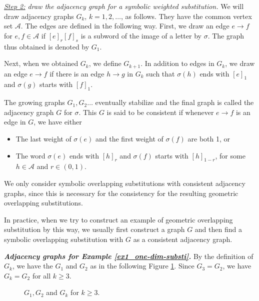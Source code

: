 \documentclass[a4]{amsart}
\theoremstyle{definition}
\newtheorem{ex}[theorem]{Example}
\begin{document}
\emph{\underline{Step 2:} draw the adjacency graph for a symbolic weighted substitution.}
We will draw adjacency graphs $G_k$, $k=1,2,\ldots$, as follows.
They have the common vertex set $\mathcal{A}$.
The edges are defined in the following way.
First, we draw an edge $e\rightarrow f$
for $e,f\in\mathcal{A}$ if $[e]_r[f]_s$ is a subword
of the image of a letter by $\sigma$.
The graph
thus obtained is denoted by $G_1$.

Next, when we obtained $G_k$, we define $G_{k+1}$. 
In addition to edges in $G_k$, we draw 
an edge $e\rightarrow f$
if there is an edge $h\rightarrow g$ in $G_k$
such that 
    $\sigma(h)$ ends with $[e]_1$ and
    $\sigma(g)$ starts with $[f]_1$.


The growing graphs $G_1,G_2\ldots$ eventually stabilize
and the final graph is called the adjacency graph $G$ for
$\sigma$. 
This $G$ is said to be consistent if whenever
$e\rightarrow f$ is an edge in $G$, we have either
\begin{itemize}
    \item The last weight of $\sigma(e)$ and
    the first weight of $\sigma(f)$ are both 1, or
    \item The word $\sigma(e)$ ends with $[h]_r$ and
    $\sigma(f)$ starts with $[h]_{1-r}$, for some 
     $h\in\mathcal{A}$ and $r\in (0,1)$.
\end{itemize}
We only consider symbolic overlapping
substitutions with consistent adjacency graphs,
since this is necessary for the consistency for
the resulting geometric overlapping substitutions.

In practice, when we try to construct an 
example of geometric overlapping substitution by this
way, we usually first construct a graph $G$
and then find a symbolic overlapping substitution
with $G$ as a consistent adjacency graph.


{\bf \textit{Adjacency graphs for Example \ref{ex1_one-dim-substi}.}}
By the definition of $G_k$, we have the $G_1$ and $G_2$ as in the following Figure \ref{Ex1-Gk}. Since $G_3=G_2$, we have $G_k=G_2$ for all $k\geq 3$.

\begin{figure}[h] %
\hskip 0.1cm 
\caption{$G_1, G_2$ and $G_k$ for $k\geq 3$.}\label{Ex1-Gk}

\end{figure}
\end{document}
